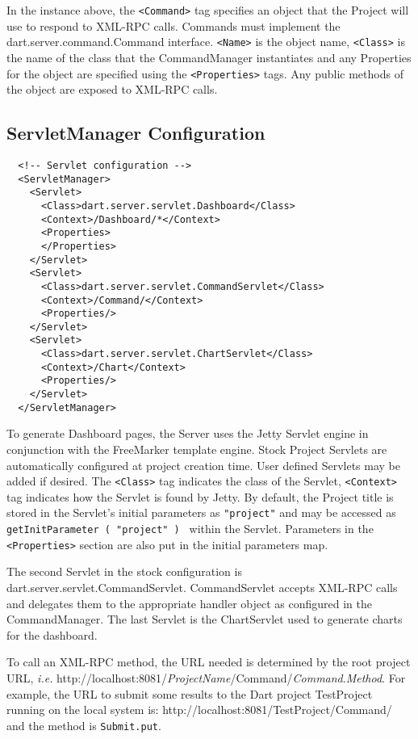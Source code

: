\documentclass{InsightBook}
\newcommand{\xmltag}[1]{\texttt{<#1>}}
\begin{document}
In the instance above, the \xmltag{Command} tag specifies an object
that the Project will use to respond to XML-RPC calls.  Commands must
implement the dart.server.command.Command interface.  \xmltag{Name}
is the object name, \xmltag{Class} is the name of the class that the
CommandManager instantiates and any Properties for the object are
specified using the \xmltag{Properties} tags.  Any public methods of
the object are exposed to XML-RPC calls.

\subsection{ServletManager Configuration}
\label{Sec:ServletManager}
\begin{verbatim}
  <!-- Servlet configuration -->
  <ServletManager>
    <Servlet>
      <Class>dart.server.servlet.Dashboard</Class>
      <Context>/Dashboard/*</Context>
      <Properties>
      </Properties>
    </Servlet>
    <Servlet>
      <Class>dart.server.servlet.CommandServlet</Class>
      <Context>/Command/</Context>
      <Properties/>
    </Servlet>
    <Servlet>
      <Class>dart.server.servlet.ChartServlet</Class>
      <Context>/Chart</Context>
      <Properties/>
    </Servlet>
  </ServletManager>
\end{verbatim}
To generate Dashboard pages, the Server uses the Jetty Servlet
engine in conjunction with the FreeMarker template engine.  Stock
Project Servlets are automatically configured at project creation
time.  User defined Servlets may be added if desired.  The
\xmltag{Class} tag indicates the class of the Servlet,
\xmltag{Context} tag indicates how the Servlet is found by Jetty.
By default, the Project title is stored in the Servlet's initial
parameters as \texttt{"project"} and may be accessed as
\texttt{getInitParameter ( "project" ) } within the Servlet.
Parameters in the \xmltag{Properties} section are also put in the
initial parameters map.

The second Servlet in the stock configuration is
dart.server.servlet.CommandServlet.  CommandServlet accepts XML-RPC
calls and delegates them to the appropriate handler object as
configured in the CommandManager.  The last Servlet is the
ChartServlet used to generate charts for the dashboard.

To call an XML-RPC method, the URL needed is determined by the root
project URL, \emph{i.e.}
http://localhost:8081/\emph{ProjectName}/Command/\emph{Command}.\emph{Method}.
 For example, the URL to submit some results to the Dart project
TestProject running on the local system is:
http://localhost:8081/TestProject/Command/ and the method is \texttt{Submit.put}.
\end{document}
